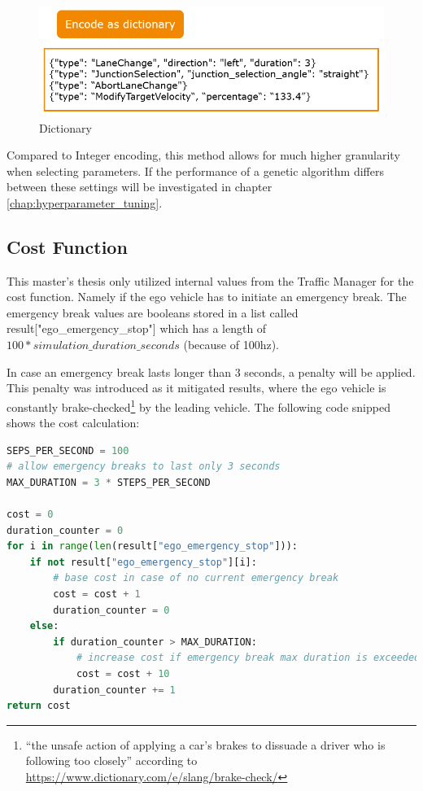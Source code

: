 \begin{figure}[ht] 
	\includegraphics[width=1\linewidth]{figures/dict_encoding}
	\caption{Dictionary}
	\label{figure:encoding:gene:dict}
\end{figure}

Compared to Integer encoding, this method allows for much higher granularity when selecting parameters. If the performance of a genetic algorithm differs between these settings will be investigated in chapter \ref{chap:hyperparameter_tuning}.

\subsection{Cost Function}
\label{implementation:cost_function}
This master's thesis only utilized internal values from the Traffic Manager for the cost function. Namely if the ego vehicle has to initiate an emergency break. The emergency break values are booleans stored in a list called result["ego\_emergency\_stop"] which has a length of $100 * simulation\_duration\_seconds$ (because of 100hz). 

In case an emergency break lasts longer than 3 seconds, a penalty will be applied. This penalty was introduced as it mitigated results, where the ego vehicle is constantly brake-checked\footnote{\enquote{the unsafe action of applying a car’s brakes to dissuade a driver who is following too closely} according to \href{https://www.dictionary.com/e/slang/brake-check/}{https://www.dictionary.com/e/slang/brake-check/}} by the leading vehicle. The following code snipped shows the cost calculation:
\begin{lstlisting}[language=Python, tabsize=4]
SEPS_PER_SECOND = 100
# allow emergency breaks to last only 3 seconds
MAX_DURATION = 3 * STEPS_PER_SECOND

cost = 0
duration_counter = 0
for i in range(len(result["ego_emergency_stop"])):
	if not result["ego_emergency_stop"][i]:
		# base cost in case of no current emergency break
		cost = cost + 1
		duration_counter = 0
	else:
		if duration_counter > MAX_DURATION:
			# increase cost if emergency break max duration is exceeded
			cost = cost + 10
		duration_counter += 1
return cost
\end{lstlisting}

